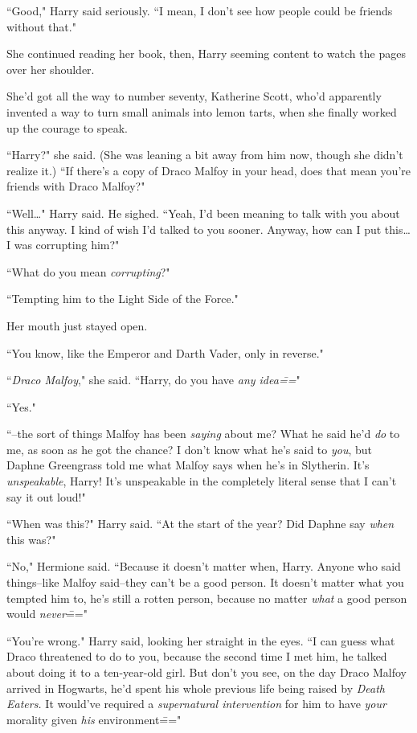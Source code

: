 ``Good," Harry said seriously. ``I mean, I don't see how people could be friends without that."

She continued reading her book, then, Harry seeming content to watch the pages over her shoulder.

She'd got all the way to number seventy, Katherine Scott, who'd apparently invented a way to turn small animals into lemon tarts, when she finally worked up the courage to speak.

``Harry?" she said. (She was leaning a bit away from him now, though she didn't realize it.) ``If there's a copy of Draco Malfoy in your head, does that mean you're friends with Draco Malfoy?"

``Well{\ldots}" Harry said. He sighed. ``Yeah, I'd been meaning to talk with you about this anyway. I kind of wish I'd talked to you sooner. Anyway, how can I put this{\ldots} I was corrupting him?"

``What do you mean \emph{corrupting}?"

``Tempting him to the Light Side of the Force."

Her mouth just stayed open.

``You know, like the Emperor and Darth Vader, only in reverse."

``\emph{Draco Malfoy}," she said. ``Harry, do you have \emph{any idea\===}"

``Yes."

``\---the sort of things Malfoy has been \emph{saying} about me? What he said he'd \emph{do} to me, as soon as he got the chance? I don't know what he's said to \emph{you}, but Daphne Greengrass told me what Malfoy says when he's in Slytherin. It's \emph{unspeakable}, Harry! It's unspeakable in the completely literal sense that I can't say it out loud!"

``When was this?" Harry said. ``At the start of the year? Did Daphne say \emph{when} this was?"

``No," Hermione said. ``Because it doesn't matter when, Harry. Anyone who said things\---like Malfoy said\---they can't be a good person. It doesn't matter what you tempted him to, he's still a rotten person, because no matter \emph{what} a good person would \emph{never}\==="

``You're wrong." Harry said, looking her straight in the eyes. ``I can guess what Draco threatened to do to you, because the second time I met him, he talked about doing it to a ten-year-old girl. But don't you see, on the day Draco Malfoy arrived in Hogwarts, he'd spent his whole previous life being raised by \emph{Death Eaters.} It would've required a \emph{supernatural intervention} for him to have \emph{your} morality given \emph{his} environment\==="

